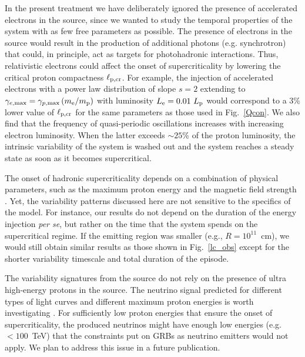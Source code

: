 \documentclass[fleqn,usenatbib]{mnras}
\newcommand{\lpcr}{\ell_{\rm p,cr}}
\begin{document}
In the present treatment we have deliberately ignored the presence of accelerated electrons in the source, since we wanted to study the temporal properties of the system with as few free parameters as possible. The presence of electrons in the source would result in the production of additional photons (e.g. synchrotron) that  could, in principle, act as targets for photohadronic interactions. Thus, relativistic electrons could affect the onset of supercriticality by lowering the critical proton compactness $\lpcr$. For example, the injection of accelerated electrons with a power law distribution of slope $s=2$ extending to $\gamma_{e,\max}=\gamma_{p,\max}\left(m_{\rm e}/m_{\rm p}\right)$ with luminosity $L_{\rm e}=0.01 \ L_{\rm p}$ would correspond to a 3\% lower value of $\lpcr$ for the same parameters as those used in Fig.~\ref{Qcon}. We also find that the frequency of quasi-periodic oscillations increases with increasing electron luminosity. When the latter exceeds  $\sim 25$\% of the proton luminosity, the intrinsic variability of the system is washed out and the system reaches a steady state as soon as it becomes supercritical.

The onset of hadronic supercriticality depends on  a combination of physical parameters, such as the maximum proton energy and the magnetic field strength \citep[e.g.][]{kirkmast92, petromast12}. Yet, the variability patterns discussed here are not sensitive to the specifics of the model. For instance, our results do not depend on the duration of the energy injection {\sl per se}, but rather on the time that the system spends on the supercritical regime.  If the emitting region was smaller (e.g., $R=10^{11}$~cm), we would still obtain similar results as those shown in Fig.~\ref{lc_obs} except for the shorter variability timescale and total duration of the episode.

The variability signatures from the source do not rely on the presence of ultra high-energy protons in the source. The neutrino signal predicted for different types of light curves and different maximum proton energies is worth investigating \citep[see also][for neutrino emissivity based on various types of GRB variability] {bustamante17}. For  sufficiently low proton energies that ensure the onset of supercriticality, the produced neutrinos might have enough low energies  (e.g. $<100 $~TeV) that the constraints put on GRBs as neutrino emitters \citep[e.g.][]{aartsen15, aartsen16} would not apply. We plan to address this issue in a future publication. 
\end{document}
